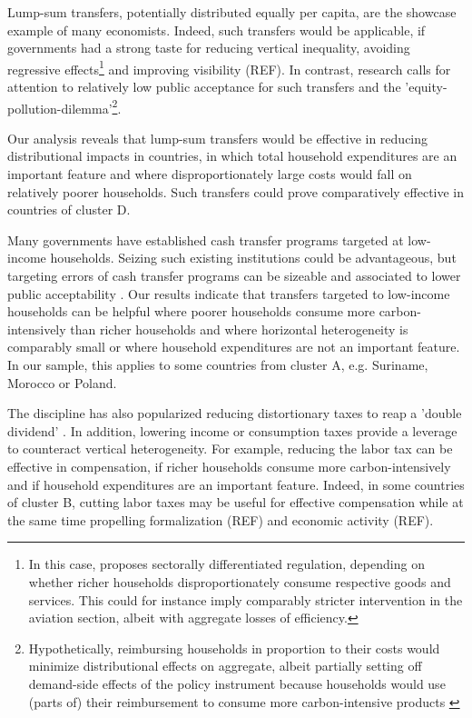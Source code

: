 \documentclass[12pt, a4paper]{article}
\begin{document}
Lump-sum transfers, potentially distributed equally per capita, are the showcase example of many economists. Indeed, such transfers would be applicable, if governments had a strong taste for reducing vertical inequality, avoiding regressive effects\footnote{In this case, \textcite{Stiglitz.2019} proposes sectorally differentiated regulation, depending on whether richer households disproportionately consume respective goods and services. This could for instance imply comparably stricter intervention in the aviation section, albeit with aggregate losses of efficiency.} and improving visibility (REF). In contrast, research calls for attention to relatively low public acceptance for such transfers and the 'equity-pollution-dilemma'\footnote{Hypothetically, reimbursing households in proportion to their costs would minimize distributional effects on aggregate, albeit partially setting off demand-side effects of the policy instrument because households would use (parts of) their reimbursement to consume more carbon-intensive products \autocite{Stiglitz.2019}}\autocite{Sager.2019}.

Our analysis reveals that lump-sum transfers would be effective in reducing distributional impacts in countries, in which total household expenditures are an important feature and where disproportionately large costs would fall on relatively poorer households. Such transfers could prove comparatively effective in countries of cluster D. %

Many governments have established cash transfer programs targeted at low-income households. Seizing such existing institutions could be advantageous, but targeting errors of cash transfer programs can be sizeable \autocite{Banerjee.2022} and associated to lower public acceptability \autocite{Bah.2019}. Our results indicate that transfers targeted to low-income households can be helpful where poorer households consume more carbon-intensively than richer households and where horizontal heterogeneity is comparably small or where household expenditures are not an important feature. In our sample, this applies to some countries from cluster A, e.g. Suriname, Morocco or Poland.

The discipline has also popularized reducing distortionary taxes to reap a 'double dividend' \autocite{Bovenberg.1996}. In addition, lowering income or consumption taxes provide a leverage to counteract vertical heterogeneity. For example, reducing the labor tax can be effective in compensation, if richer households consume more carbon-intensively and if household expenditures are an important feature. Indeed, in some countries of cluster B, cutting labor taxes may be useful for effective compensation while at the same time propelling formalization (REF) and economic activity (REF).
\end{document}
